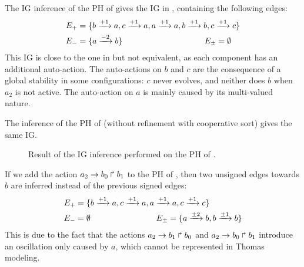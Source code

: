 \begin{example}
The IG inference of the PH of  gives the
IG in , containing the following edges:
\begin{align*}
  E_+ &= \{b \xrightarrow{+ 1} a, c \xrightarrow{+ 1} a, a \xrightarrow{+ 1} a, b \xrightarrow{+ 1} b, c \xrightarrow{+ 1} c\}\\
  E_- &= \{a \xrightarrow{- 2} b\} \qquad\qquad\qquad\qquad\qquad
  E_\pm = \emptyset
\end{align*}
This IG is close to the one in  but not equivalent,
as each component has an additional auto-action.
The auto-actions on $b$ and $c$ are the consequence of a global stability
in some configurations: $c$ never evolves, and neither does $b$ when $a_2$ is not active.
The auto-action on $a$ is mainly caused by its multi-valued nature.

The inference of the PH of 
(without refinement with cooperative sort) gives the same IG.

\begin{figure}[t]
\centering
{}
\caption{\label{fig:BRN-inf1}
  Result of the IG inference performed on the PH of .
}
\end{figure}

\end{example}



\begin{example}
If we add the action $a_2\rightarrow b_0\Rsh b_1$ to the PH of ,
then two unsigned edges towards $b$ are inferred instead of the previous signed edges:
\begin{align*}
  E_+ &= \{b \xrightarrow{+ 1} a, c \xrightarrow{+ 1} a, a \xrightarrow{+ 1} a, c \xrightarrow{+ 1} c\}\\
  E_- &= \emptyset \qquad\qquad\qquad\qquad
  E_\pm = \{a \xrightarrow{\pm 2} b, b \xrightarrow{\pm 1} b\}
\end{align*}
This is due to the fact that the actions $a_2\rightarrow b_1\Rsh b_0$ and $a_2\rightarrow b_0\Rsh b_1$
introduce an oscillation only caused by $a$, which cannot be represented in Thomas modeling.
\end{example}
